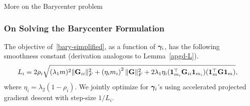 \begin{subsection}{More on the Barycenter problem}
\subsubsection{On Solving the Barycenter Formulation}\label{solve_bary} The objective of~\ref{bary-simplified}, as a function of $\bm{\gamma}_i$, has the following smoothness constant (derivation analogous to Lemma~\ref{apgd-L}). 
\begin{equation*}
L_i = 2 \rho_i\sqrt{(\lambda_1m)^2\|\mathbf{G}_{ii}\|_F^2+\left(\eta_i m_i\right)^2\|\mathbf{G}\|_F^2 + 2\lambda_1\eta_i(\mathbf{1}_{m_i}^\top \mathbf{G}_{ii}\mathbf{1}_{m_i}) (\mathbf{1}_m^\top \mathbf{G}\mathbf{1}_m)},
\end{equation*}
where $\eta_i = \lambda_2(1-\rho_i)$. We jointly optimize for $\bm{\gamma}_i$'s using accelerated projected gradient descent with step-size $1/L_i$.
\end{subsection}
